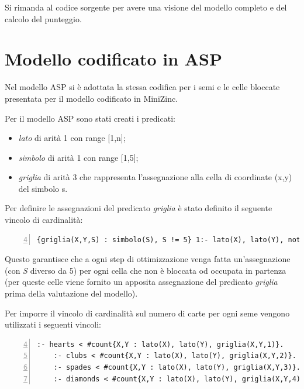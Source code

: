 \documentclass[12pt]{article}
\begin{document}
    Si rimanda al codice sorgente per avere una visione del modello completo e del calcolo del punteggio.

    \section{Modello codificato in ASP}\label{sec:modello-codificato-in-asp}
    Nel modello ASP si è adottata la stessa codifica per i semi e le celle bloccate presentata per il modello codificato in MiniZinc.

    Per il modello ASP sono stati creati i predicati:

    \begin{itemize}
        \item \textit{lato} di arità 1 con range [1,n];
        \item \textit{simbolo} di arità 1 con range [1,5];
        \item \textit{griglia} di arità 3 che rappresenta l'assegnazione alla cella di coordinate (x,y) del simbolo s.
    \end{itemize}

    Per definire le assegnazioni del predicato \textit{griglia} è stato definito il seguente vincolo di cardinalità:

    \begin{Verbatim}[numbers=left,firstnumber=4,frame=lines,framesep=3mm,label={verb:asp\_allocation},breaklines=true]
    {griglia(X,Y,S) : simbolo(S), S != 5} 1:- lato(X), lato(Y), not griglia(X, Y, 5).
    \end{Verbatim}

    Questo garantisce che a ogni step di ottimizzazione venga fatta un'assegnazione (con \textit{S} diverso da 5) per ogni cella che non è bloccata od occupata in partenza (per queste celle viene fornito un apposita assegnazione del predicato \textit{griglia} prima della valutazione del modello).

    Per imporre il vincolo di cardinalità sul numero di carte per ogni seme vengono utilizzati i seguenti vincoli:

    \begin{Verbatim}[numbers=left,firstnumber=4,frame=lines,framesep=3mm,label={verb:asp\_cardinality},breaklines=true]
    :- hearts < #count{X,Y : lato(X), lato(Y), griglia(X,Y,1)}.
    :- clubs < #count{X,Y : lato(X), lato(Y), griglia(X,Y,2)}.
    :- spades < #count{X,Y : lato(X), lato(Y), griglia(X,Y,3)}.
    :- diamonds < #count{X,Y : lato(X), lato(Y), griglia(X,Y,4)}.
    \end{Verbatim}
\end{document}
